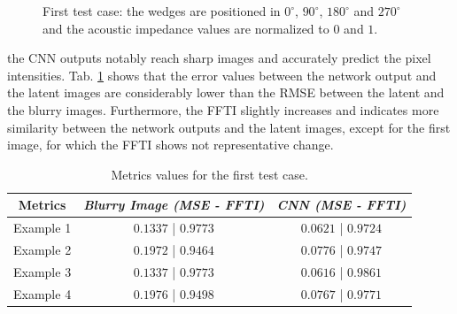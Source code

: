\documentclass[conference]{IEEEtran}
\begin{document}
\begin{figure}[!t]
{\label{fig_second_case_cnn}}
\caption{First test case: the wedges are positioned in 
$0^{\circ}$, $90^{\circ}$, $180^{\circ}$ and $270^{\circ}$ and the acoustic impedance values are normalized to $0$ and $1$.}
\label{fig_scenario1}
\end{figure}
the CNN outputs notably reach sharp images and accurately
predict the pixel intensities. Tab. \ref{table_caso_1} shows that the error values between the network output and the latent images are considerably lower than the RMSE between the latent and the blurry images. Furthermore,
the FFTI slightly increases and indicates more similarity between the network outputs
and the latent images, except for the first image, for which the FFTI shows not representative change.
\begin{table}[!t]
\renewcommand{\arraystretch}{1.2}
\caption{Metrics values for the first test case.}
\label{table_caso_1}
\centering
\begin{tabular}{|c||c||c|}
\hline
 \textbf{Metrics} & \textbf{\textit{Blurry Image (MSE - FFTI)}} & \textbf{\textit{CNN (MSE - FFTI)}}\\
\hline
Example 1 & $0.1337$ | $0.9773$ & $0.0621$ | $0.9724$\\
\hline
Example 2 & $0.1972$ | $0.9464$ & $0.0776$ | $0.9747$\\
\hline
Example 3 & $0.1337$ | $0.9773$ & $0.0616$ | $0.9861$\\
\hline
Example 4 & $0.1976$ | $0.9498$ & $0.0767$ | $0.9771$\\
\hline
\end{tabular}
\end{table}
\end{document}
